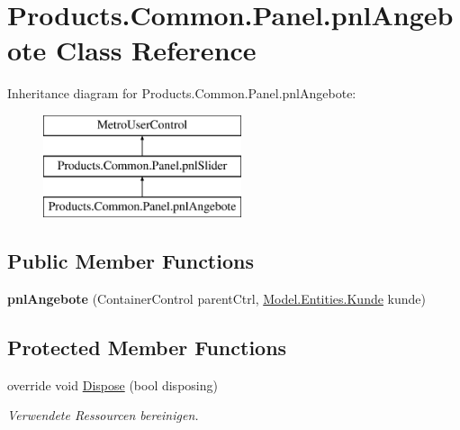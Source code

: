 \hypertarget{class_products_1_1_common_1_1_panel_1_1pnl_angebote}{}\section{Products.\+Common.\+Panel.\+pnl\+Angebote Class Reference}
\label{class_products_1_1_common_1_1_panel_1_1pnl_angebote}
Inheritance diagram for Products.\+Common.\+Panel.\+pnl\+Angebote\+:\begin{figure}[H]
\begin{center}
\leavevmode
\includegraphics[height=3.000000cm]{class_products_1_1_common_1_1_panel_1_1pnl_angebote}
\end{center}
\end{figure}
\subsection*{Public Member Functions}
\begin{DoxyCompactItemize}
\item 
{\bfseries pnl\+Angebote} (Container\+Control parent\+Ctrl, \hyperlink{class_products_1_1_model_1_1_entities_1_1_kunde}{Model.\+Entities.\+Kunde} kunde)\hypertarget{class_products_1_1_common_1_1_panel_1_1pnl_angebote_a736ebcb89e04a8e67bd6a4ac99febaba}{}\label{class_products_1_1_common_1_1_panel_1_1pnl_angebote_a736ebcb89e04a8e67bd6a4ac99febaba}

\end{DoxyCompactItemize}
\subsection*{Protected Member Functions}
\begin{DoxyCompactItemize}
\item 
override void \hyperlink{class_products_1_1_common_1_1_panel_1_1pnl_angebote_a46bb6db214b424ca4dd9a56585c8d3bd}{Dispose} (bool disposing)
\begin{DoxyCompactList}\small\item\em Verwendete Ressourcen bereinigen. \end{DoxyCompactList}\end{DoxyCompactItemize}
